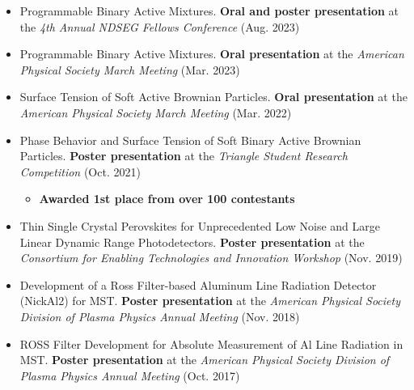 \documentclass[
	a4paper,
	sidecolor=gray!50,
	sectioncolor=materialblue,
	subsectioncolor=materialindigo,
	profilepicsize=3.5cm,
	profilepicstyle=profilecircle,
	profilepiczoom=1.0,
]{LauersdorfCV}
\begin{document}
\begin{itemize}
    \item Programmable Binary Active Mixtures. \textbf{Oral and poster presentation} at the \textit{4th Annual NDSEG Fellows Conference} (Aug. 2023)

    \vspace{-2mm}

    \item Programmable Binary Active Mixtures. \textbf{Oral presentation} at the  \textit{American Physical Society March Meeting} (Mar. 2023)

    \vspace{-2mm}

    \item Surface Tension of Soft Active Brownian Particles. \textbf{Oral presentation} at the \textit{American Physical Society March Meeting} (Mar. 2022)

    \vspace{-2mm}
    
    \item Phase Behavior and Surface Tension of Soft Binary Active Brownian Particles. \textbf{Poster presentation} at the \textit{Triangle Student Research Competition} (Oct. 2021)

    \vspace{-3mm}
    
    \begin{itemize}
        \item \textbf{Awarded 1st place from over 100 contestants}
    \end{itemize} 

    \vspace{-4mm}

    \item Thin Single Crystal Perovskites for Unprecedented Low Noise and Large Linear Dynamic Range Photodetectors. \textbf{Poster presentation} at the \textit{Consortium for Enabling Technologies and Innovation Workshop} (Nov. 2019)

    \vspace{-2mm}

    \item Development of a Ross Filter-based Aluminum Line Radiation Detector (NickAl2) for MST. \textbf{Poster presentation} at the \textit{American Physical Society Division of Plasma Physics Annual Meeting} (Nov. 2018)

    \vspace{-2mm}

    \item ROSS Filter Development for Absolute Measurement of Al Line Radiation in MST. \textbf{Poster presentation} at the \textit{American Physical Society Division of Plasma Physics Annual Meeting} (Oct. 2017) 

\end{itemize}
\end{document}
